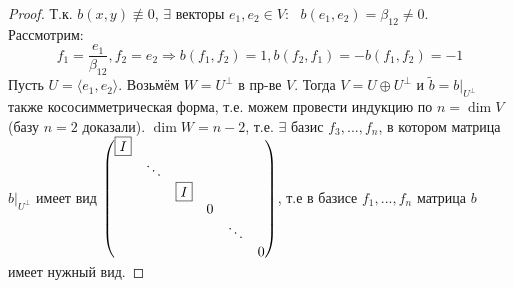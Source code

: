 \begin{proof}
    Т.к. $b(x,y) \not \equiv 0$, $\exists$ векторы $e_1, e_2 \in V$: \ $b(e_1, e_2) = \beta_{12} \neq 0$. \\
    Рассмотрим:
    $$f_1 = \frac{e_1}{\beta_{12}}, f_2 = e_2 \Longrightarrow  b(f_1,f_2) = 1, b(f_2,f_1) = -b(f_1,f_2) = -1$$
    Пусть $U = \langle e_1, e_2\rangle$. Возьмём $W = U^{\perp}$ в пр-ве $V$. Тогда $V = U \oplus U^{\perp}$ и $\tilde{b} = b|_{U^{\perp}}$ также кососимметрическая форма, т.е. можем провести индукцию по $n = \dim V$ (базу $n = 2$ доказали). $\dim W = n-2$, т.е. $\exists$ базис $f_3,...,f_n$, в котором матрица $b|_{U^{\perp}}$ имеет вид $\begin{pmatrix}
    \text{\fbox{$I$}}\\
    \null & \ddots\\
    \null & \null & \text{\fbox{$I$}}\\
    \null & \null & \null & 0\\
    \null & \null & \null & \null & \ddots\\
    \null & \null & \null & \null & \null & 0
    \end{pmatrix}$, т.е в базисе $f_1,...,f_n$ матрица $b$ имеет нужный вид.
\end{proof}